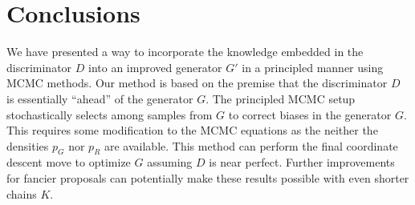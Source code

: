 \documentclass{article}
\newcommand{\PG}{{p_G}}
\newcommand{\PR}{{p_R}}
\begin{document}
\section{Conclusions}

We have presented a way to incorporate the knowledge embedded in the discriminator $D$ into an improved generator $G'$ in a principled manner using MCMC methods.
Our method is based on the premise that the discriminator $D$ is essentially ``ahead'' of the generator $G$.
The principled MCMC setup stochastically selects among samples from $G$ to correct biases in the generator $G$.
This requires some modification to the MCMC equations as the neither the densities $\PG$ nor $\PR$ are available.
This method can perform the final coordinate descent move to optimize $G$ assuming $D$ is near perfect.
Further improvements for fancier proposals can potentially make these results possible with even shorter chains $K$.


\end{document}

